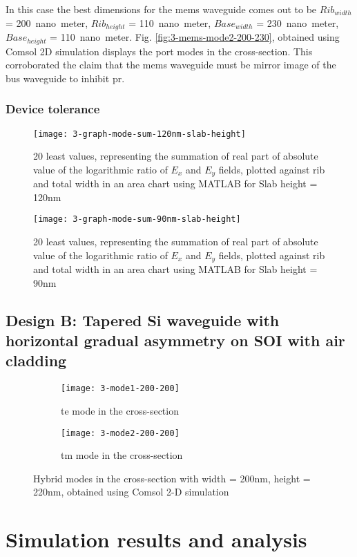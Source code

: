 \documentclass[../report.tex]{subfiles}
\begin{document}
In this case the best dimensions for the \gls{mems} waveguide comes out to be $Rib_{width}$ = \SI{200}{nano meter}, $Rib_{height}$ = \SI{110}{nano meter}, $Base_{width}$ = \SI{230}{nano meter}, $Base_{height}$ = \SI{110}{nano meter}. Fig. \ref{fig:3-mems-mode2-200-230}, obtained using Comsol 2D simulation displays the port modes in the cross-section. This corroborated the claim that the \gls{mems} waveguide must be mirror image of the bus waveguide to inhibit \gls{pr}.

\subsubsection{Device tolerance}

\begin{figure}[H] %
	\centering
	\texttt{[image: 3-graph-mode-sum-120nm-slab-height]}
	\caption{20 least values, representing the summation of real part of absolute value of the logarithmic ratio of $E_x$ and $E_y$ fields, plotted against rib and total width in an area chart using MATLAB for Slab height = 120nm}
	\label{fig:3_graph_mode_sum_120nm_slab_height}
\end{figure}

\begin{figure}[H] %
	\centering
	\texttt{[image: 3-graph-mode-sum-90nm-slab-height]}
	\caption{20 least values, representing the summation of real part of absolute value of the logarithmic ratio of $E_x$ and $E_y$ fields, plotted against rib and total width in an area chart using MATLAB for Slab height = 90nm}
	\label{fig:3_graph_mode_sum_90nm_slab_height}
\end{figure}
				
		\subsection{Design B: Tapered Si waveguide with horizontal gradual asymmetry on SOI with air cladding}
		
\begin{figure}[H] %
	\begin{subfigure}[t]{0.45\textwidth}
		\texttt{[image: 3-mode1-200-200]}
		\caption{\gls{te} mode in the cross-section}
		\label{fig:3_mode1_200_200}
	\end{subfigure}
	\hfill
	\begin{subfigure}[t]{0.45\textwidth}
		\texttt{[image: 3-mode2-200-200]}
		\caption{\gls{tm} mode in the cross-section}
		\label{fig:3_mode2_200_200}
	\end{subfigure}
	\caption{Hybrid modes in the cross-section with width = 200nm, height = 220nm, obtained using Comsol 2-D simulation}
\end{figure}
	
	\section{Simulation results and analysis}
	
\end{document}
